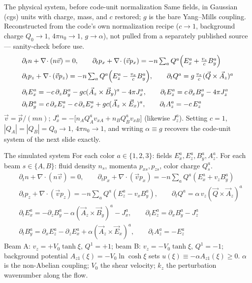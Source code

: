 \documentclass[aspectratio=169,11pt]{beamer}
\newcommand{\Vo}{V_0}
\newcommand{\kz}{k_z}
\newcommand{\Az}{A_{z1}}
\begin{document}
\begin{frame}{The physical system, before code-unit normalization}
\footnotesize
Same fields, in Gaussian (cgs) units with charge, mass, and $c$ restored;
$g$ is the bare Yang--Mills coupling. Reconstructed from the code's own
normalization recipe ($c\to1$, background charge $Q_0\to1$, $4\pi n_0\to1$,
$g\to\alpha$), not pulled from a separately published source --- sanity-check
before use.
\vspace{0.05em}
\begin{align*}
&\partial_t n+\nabla\!\cdot(n\vec v)=0, \qquad
\partial_t p_x+\nabla\!\cdot(\vec v p_x)=-n\textstyle\sum_a Q^a\Bigl(E_x^a+\tfrac{v_z}{c}B_y^a\Bigr)\\
&\partial_t p_z+\nabla\!\cdot(\vec v p_z)=-n\textstyle\sum_a Q^a\Bigl(E_z^a-\tfrac{v_x}{c}B_y^a\Bigr),\qquad
\partial_t Q^a=g\,\tfrac{v_z}{c}(\vec Q\times\vec A_z)^a\\[0.3em]
&\partial_t E_x^a=-c\,\partial_zB_y^a-gc(\vec A_z\times\vec B_y)^a-4\pi J_x^a,\qquad
\partial_t E_z^a=c\,\partial_xB_y^a-4\pi J_z^a\\
&\partial_t B_y^a=c\,\partial_xE_z^a-c\,\partial_zE_x^a+gc(\vec A_z\times\vec E_x)^a,
\qquad \partial_t A_z^a=-c\,E_z^a
\end{align*}
$\vec v=\vec p/(mn)$; $J_x^a=-\bigl[n_AQ_A^av_{xA}+n_BQ_B^av_{xB}\bigr]$ (likewise
$J_z^a$). Setting $c=1$, $|Q_A|=|Q_B|=Q_0\to1$, $4\pi n_0\to1$, and writing
$\alpha\equiv g$ recovers the code-unit system of the next slide exactly.
\end{frame}

\begin{frame}{The simulated system}
For each color $a\in\{1,2,3\}$: fields $E_x^a,E_z^a,B_y^a,A_z^a$. For each beam
$s\in\{A,B\}$: fluid density $n_s$, momenta $p_{xs},p_{zs}$, color charge $Q_s^a$.
\vspace{0.05em}
\begin{align*}
&\partial_t n+\nabla\!\cdot(n\vec v)=0, \qquad
\partial_t p_x+\nabla\!\cdot(\vec v p_x)=-n\textstyle\sum_a Q^a(E_x^a+v_zB_y^a)\\
&\partial_t p_z+\nabla\!\cdot(\vec v p_z)=-n\textstyle\sum_a Q^a(E_z^a-v_xB_y^a),\qquad
\partial_t Q^a=\alpha\,v_z(\vec Q\times\vec A_z)^a\\[0.3em]
&\partial_t E_x^a=-\partial_zB_y^a-\alpha(\vec A_z\times\vec B_y)^a-J_x^a,\qquad
\partial_t E_z^a=\partial_xB_y^a-J_z^a\\
&\partial_t B_y^a=\partial_xE_z^a-\partial_zE_x^a+\alpha(\vec A_z\times\vec E_x)^a,
\qquad \partial_t A_z^a=-E_z^a
\end{align*}
Beam A: $v_z=+\Vo\tanh\xi$, $Q^1=+1$; beam B: $v_z=-\Vo\tanh\xi$, $Q^1=-1$;
background potential $\Az(\xi)=-\Vo\ln\cosh\xi$ sets $u(\xi)\equiv-\alpha\Az(\xi)\ge0$.
$\alpha$ is the non-Abelian coupling; $\Vo$ the shear velocity; $\kz$ the
perturbation wavenumber along the flow.
\end{frame}
\end{document}
